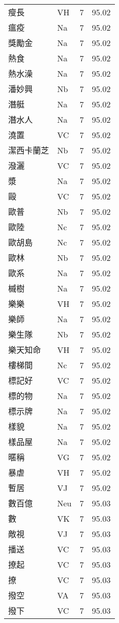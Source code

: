\documentclass[twocolumn]{book}
\begin{document}
\begin{supertabular}{llrr}
瘦長 & VH & 7 &  95.02\\
瘟疫 & Na & 7 &  95.02\\
獎勵金 & Na & 7 &  95.02\\
熱食 & Na & 7 &  95.02\\
熱水澡 & Na & 7 &  95.02\\
潘妙興 & Nb & 7 &  95.02\\
潛艇 & Na & 7 &  95.02\\
潛水人 & Na & 7 &  95.02\\
澆置 & VC & 7 &  95.02\\
潔西卡蘭芝 & Nb & 7 &  95.02\\
潑灑 & VC & 7 &  95.02\\
漿 & Na & 7 &  95.02\\
毆 & VC & 7 &  95.02\\
歐普 & Nb & 7 &  95.02\\
歐陸 & Nc & 7 &  95.02\\
歐胡島 & Nc & 7 &  95.02\\
歐林 & Nb & 7 &  95.02\\
歐系 & Na & 7 &  95.02\\
槭樹 & Na & 7 &  95.02\\
樂樂 & VH & 7 &  95.02\\
樂師 & Na & 7 &  95.02\\
樂生隊 & Nb & 7 &  95.02\\
樂天知命 & VH & 7 &  95.02\\
樓梯間 & Nc & 7 &  95.02\\
標記好 & VC & 7 &  95.02\\
標的物 & Na & 7 &  95.02\\
標示牌 & Na & 7 &  95.02\\
樣貌 & Na & 7 &  95.02\\
樣品屋 & Na & 7 &  95.02\\
暱稱 & VG & 7 &  95.02\\
暴虐 & VH & 7 &  95.02\\
暫居 & VJ & 7 &  95.02\\
數百億 & Neu & 7 &  95.03\\
數 & VK & 7 &  95.03\\
敵視 & VJ & 7 &  95.03\\
播送 & VC & 7 &  95.03\\
撩起 & VC & 7 &  95.03\\
撩 & VC & 7 &  95.03\\
撥空 & VA & 7 &  95.03\\
撥下 & VC & 7 &  95.03\\

\end{supertabular}
\end{document}
